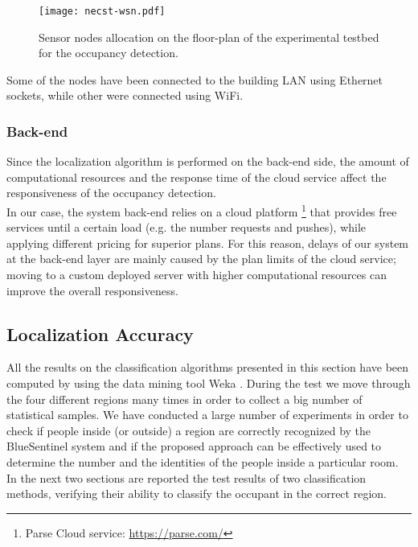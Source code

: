 \begin{figure}[h!tb]
\centering\texttt{[image: necst-wsn.pdf]}
\caption[Sensor nodes allocation on the floor-plan of the experimental testbed for the occupancy detection.]{Sensor nodes allocation on the floor-plan of the experimental testbed for the occupancy detection.}
\label{fig:wsn-sketch}
\end{figure}

Some of the nodes have been connected to the building LAN using Ethernet sockets, while other were connected using WiFi.

\subsubsection{Back-end}
\label{sub:test-backend}
Since the localization algorithm is performed on the back-end side, the amount of computational resources and the response time of the cloud service affect the responsiveness of the occupancy detection.\\
In our case, the system back-end relies on a cloud platform
\footnote{Parse Cloud service: \url{https://parse.com/}}
that provides free services until a certain load (e.g. the number requests and pushes), while applying different pricing for superior plans.
For this reason, delays of our system at the back-end layer are mainly caused by the plan limits of the cloud service; moving to a custom deployed server with higher computational resources can improve the overall responsiveness.

\subsection{Localization Accuracy}
\label{sec:loc-accuracy}
All the results on the classification algorithms presented in this section have been computed by using the data mining tool Weka \cite{Hall2009}.
During the test we move through the four different regions many times in order to collect a big number of statistical samples.
We have conducted a large number of experiments in order to check if people inside (or outside) a region are correctly recognized by the BlueSentinel system and if the proposed approach can be effectively used to determine the number and the identities of the people inside a particular room.
In the next two sections are reported the test results of two classification methods, verifying their ability to classify the occupant in the correct region.

